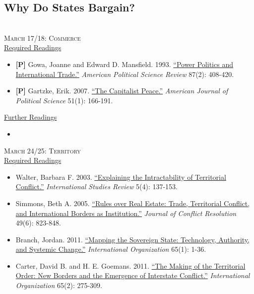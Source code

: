 \documentclass[11pt]{article}
\begin{document}
\vspace{2mm}
\subsection*{Why Do States Bargain?}

~\\
\textsc{March 17/18: Commerce} \\

\noindent \underline{Required Readings}

\begin{itemize}
\item \textbf{[P]} Gowa, Joanne and Edward D. Mansfield. 1993. \href{http://www.jstor.org/stable/2939050}{``Power Politics and International Trade.''} \textit{American Political Science Review} 87(2): 408-420.
\item \textbf{[P]} Gartzke, Erik. 2007. \href{http://onlinelibrary.wiley.com/doi/10.1111/j.1540-5907.2007.00244.x/abstract}{``The Capitalist Peace.''} \textit{American Journal of Political Science} 51(1): 166-191.
\end{itemize}

\noindent \underline{Further Readings}

\begin{itemize}
\item
\end{itemize}


\noindent \textsc{March 24/25: Territory} \\

\noindent \underline{Required Readings}

\begin{itemize}
\item Walter, Barbara F. 2003. \href{http://onlinelibrary.wiley.com/doi/10.1111/j.1079-1760.2003.00504012.x/abstract}{``Explaining the Intractability of Territorial Conflict.''} \textit{International Studies Review} 5(4): 137-153.
\item Simmons, Beth A. 2005. \href{http://www.jstor.org/stable/30045138}{``Rules over Real Estate: Trade, Territorial Conflict, and International Borders as Institution.''} \textit{Journal of Conflict Resolution} 49(6): 823-848.
\item Branch, Jordan. 2011. \href{http://www.jstor.org/stable/23016102}{``Mapping the Sovereign State: Technology, Authority, and Systemic Change.''} \textit{International Organization} 65(1): 1-36.
\item Carter, David B. and H. E. Goemans. 2011. \href{http://www.jstor.org/stable/23016813}{``The Making of the Territorial Order: New Borders and the Emergence of Interstate Conflict.''} \textit{International Organization} 65(2): 275-309.
\end{itemize}
\end{document}
